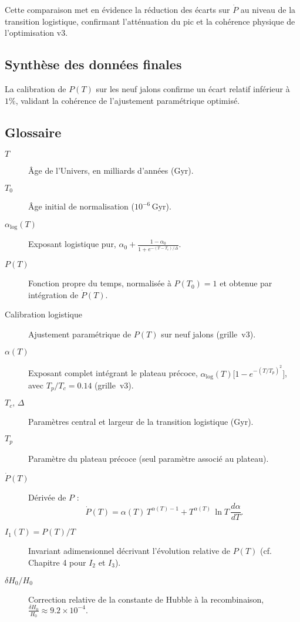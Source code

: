 Cette comparaison met en évidence la réduction des écarts sur \(\dot P\)  
au niveau de la transition logistique, confirmant l’atténuation du pic  
et la cohérence physique de l’optimisation v3.

\subsection{Synthèse des données finales}

La calibration de \(P(T)\) sur les neuf jalons confirme un écart relatif  
inférieur à \(1\%\), validant la cohérence de l’ajustement paramétrique optimisé.  

\subsection{Glossaire}

\begin{description}
  \item[$T$] Âge de l’Univers, en milliards d’années (\(\mathrm{Gyr}\)).  
  \item[$T_{0}$] Âge initial de normalisation (\(10^{-6}\)\,\(\mathrm{Gyr}\)).  
  \item[$\alpha_{\mathrm{log}}(T)$] Exposant logistique pur,  
    \(\displaystyle \alpha_{0} 
      + \frac{1-\alpha_{0}}{1 + e^{-(T - T_{c})/\Delta}}\).
  \item[$P(T)$] Fonction propre du temps,  
  normalisée à \(P(T_{0})=1\) et obtenue par intégration de \(\dot P(T)\).
  \item[Calibration logistique] Ajustement paramétrique de \(P(T)\) sur neuf jalons (grille~v3).  
  \item[$\alpha(T)$] Exposant complet intégrant le plateau précoce,  
    \(\displaystyle \alpha_{\mathrm{log}}(T)\bigl[1 - e^{-(T/T_{p})^{2}}\bigr]\),  
    avec \(T_{p}/T_{c}=0.14\) (grille~v3).  
  \item[$T_{c},\,\Delta$] Paramètres central et largeur de la transition logistique (Gyr).  
  \item[$T_{p}$] Paramètre du plateau précoce (seul paramètre associé au plateau).  
  \item[$\dot P(T)$] Dérivée de \(P\) :  
    \[
      \dot P(T)
      = \alpha(T)\,T^{\alpha(T)-1}
      + T^{\alpha(T)}\,\ln T\,\frac{d\alpha}{dT}.
    \]
  \item[$I_{1}(T)=P(T)/T$] Invariant adimensionnel décrivant l’évolution relative de \(P(T)\) (cf. Chapitre 4 pour \(I_{2}\) et \(I_{3}\)).
  \item[$\delta H_{0}/H_{0}$] Correction relative de la constante de Hubble à la recombinaison,  
    \(\displaystyle\frac{\delta H_{0}}{H_{0}}\approx9.2\times10^{-4}.\)  
\end{description}